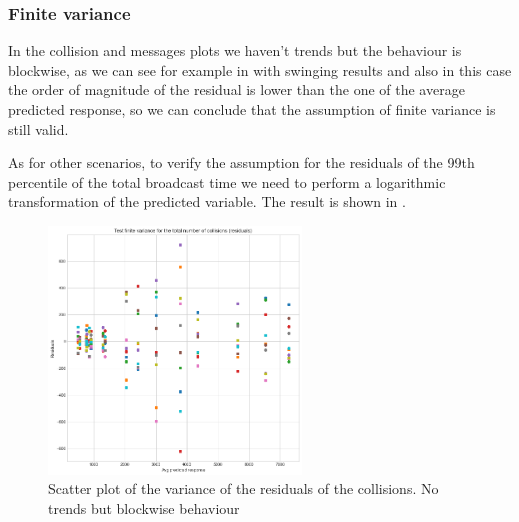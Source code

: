 \subsubsection{Finite variance}\label{rectassumptionsvariance}

In the collision and messages plots we haven't trends but the behaviour is
blockwise, as we can see for example in  with
swinging results and also in this case the order of magnitude of the residual is
lower than the one of the average predicted response, so we can conclude that
the assumption of finite variance is still valid.

As for other scenarios, to verify the assumption for the residuals of the 99th
percentile of the total broadcast time we need to perform a logarithmic
transformation of the predicted variable. The result is shown in
.

\begin{figure}[htb]
	\centering
	\includegraphics[width=0.6\textwidth]{img/rect/collisionvariance.png}
	\caption{Scatter plot of the variance of the residuals of the
	collisions. No trends but blockwise
	behaviour}\label{fig:recttimevariance}
\end{figure}
